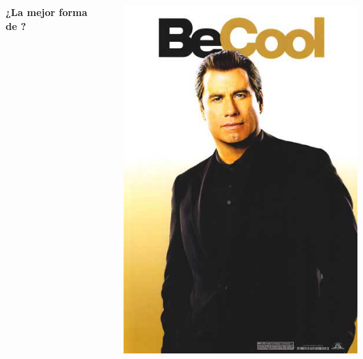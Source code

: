 \documentclass[14pt]{beamer}
\begin{document}
\begin{frame}{}
  \begin{columns}
    \begin{block}{}\centering\Large\bf
      ¿La mejor forma de ?
    \end{block}
    \begin{center}
    \end{center}
    \includegraphics[width=.9\textwidth]{pics/be-cool.jpg}
  \end{columns}
\end{frame}
\end{document}
